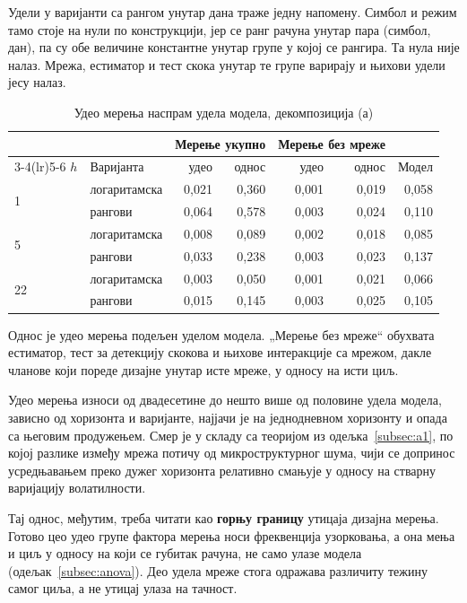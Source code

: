 Удели у варијанти са рангом унутар дана траже једну напомену. Симбол и режим тамо
стоје на нули по конструкцији, јер се ранг рачуна унутар пара (симбол, дан), па су обе
величине константне унутар групе у којој се рангира. Та нула није налаз. Мрежа,
естиматор и тест скока унутар те групе варирају и њихови удели јесу налаз.

\begin{table}[htbp]
\centering
\caption{Удео мерења наспрам удела модела, декомпозиција (а)}
\label{tab:anova-odnos}
\begin{tabular}{llrrrrr}
\toprule
& & \multicolumn{2}{c}{Мерење укупно} & \multicolumn{2}{c}{Мерење без мреже} & \\
\cmidrule(lr){3-4}\cmidrule(lr){5-6}
$h$ & Варијанта & удео & однос & удео & однос & Модел \\
\midrule
\multirow{2}{*}{1}  & логаритамска & 0,021 & 0,360 & 0,001 & 0,019 & 0,058 \\
                    & рангови      & 0,064 & 0,578 & 0,003 & 0,024 & 0,110 \\
\midrule
\multirow{2}{*}{5}  & логаритамска & 0,008 & 0,089 & 0,002 & 0,018 & 0,085 \\
                    & рангови      & 0,033 & 0,238 & 0,003 & 0,023 & 0,137 \\
\midrule
\multirow{2}{*}{22} & логаритамска & 0,003 & 0,050 & 0,001 & 0,021 & 0,066 \\
                    & рангови      & 0,015 & 0,145 & 0,003 & 0,025 & 0,105 \\
\bottomrule
\end{tabular}

\vspace{0.4em}
{\footnotesize Однос је удео мерења подељен уделом модела. „Мерење без мреже“ обухвата
естиматор, тест за детекцију скокова и њихове интеракције са мрежом, дакле чланове који
пореде дизајне унутар исте мреже, у односу на исти циљ.\par}
\end{table}

Удео мерења износи од двадесетине до нешто више од половине удела модела, зависно од
хоризонта и варијанте, најјачи је на једнодневном хоризонту и опада са његовим
продужењем. Смер је у складу са теоријом из одељка~\ref{subsec:a1}, по којој разлике између мрежа
потичу од микроструктурног шума, чији се допринос усредњавањем преко дужег хоризонта
релативно смањује у односу на стварну варијацију волатилности.

Тај однос, међутим, треба читати као \textbf{горњу границу} утицаја дизајна мерења.
Готово цео удео групе фактора мерења носи фреквенција узорковања, а она мења и циљ у
односу на који се губитак рачуна, не само улазе модела (одељак~\ref{subsec:anova}). Део
удела мреже стога одражава различиту тежину самог циља, а не утицај улаза на тачност.

